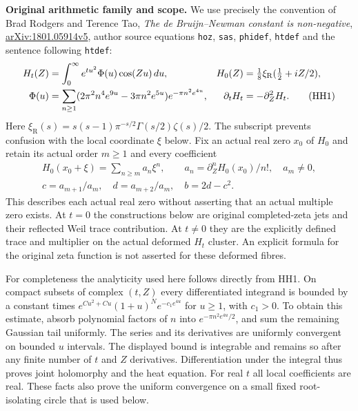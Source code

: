 \documentclass[11pt,a4paper]{article}
\theoremstyle{definition}\newtheorem{definition}[theorem]{Definition}
\begin{document}
\HH\textbf{Original arithmetic family and scope.}
We use precisely the convention of Brad Rodgers and Terence Tao,
\emph{The de Bruijn--Newman constant is non-negative},
\href{https://arxiv.org/abs/1801.05914v5}{arXiv:1801.05914v5},
author source equations \texttt{hoz}, \texttt{sas}, \texttt{phidef},
\texttt{htdef} and the sentence following \texttt{htdef}:
\begin{align}
 H_t(Z)&=\int_0^\infty e^{tu^2}\Phi(u)\cos(Zu)\,du,&
 H_0(Z)&=\tfrac18\xi_{\mathrm R}(\tfrac12+iZ/2),\notag\\
 \Phi(u)&=\sum_{n\ge1}
 (2\pi^2n^4e^{9u}-3\pi n^2e^{5u})e^{-\pi n^2e^{4u}},&
 \partial_tH_t&=-\partial_Z^2H_t .
 \tag{HH1}\label{hh:original}
\end{align}
Here $\xi_{\mathrm R}(s)=s(s-1)\pi^{-s/2}\Gamma(s/2)\zeta(s)/2$.
The subscript prevents confusion with the local coordinate $\xi$ below.
Fix an actual real zero $x_0$ of $H_0$ and retain its actual order
$m\ge1$ and every coefficient
\[
 \begin{gathered}
 H_0(x_0+\xi)=\sum_{n\ge m}a_n\xi^n,\qquad
 a_n=\partial_Z^nH_0(x_0)/n!,\quad a_m\ne0,\\
 c=a_{m+1}/a_m,\quad d=a_{m+2}/a_m,\quad b=2d-c^2 .
 \end{gathered}
 \tag{HH2}\label{hh:coeff}
\]
This describes each actual real zero without asserting that an actual
multiple zero exists. At $t=0$ the constructions below are original
completed-zeta jets and their reflected Weil trace contribution.
At $t\ne0$ they are the explicitly defined trace and multiplier on
the actual deformed $H_t$ cluster. An explicit formula for the original
zeta function is not asserted for these deformed fibres.

For completeness the analyticity used here follows directly from HH1.
On compact subsets of complex $(t,Z)$ every differentiated integrand
is bounded by a constant times
$e^{C u^2+Cu}(1+u)^N e^{-c_1e^{4u}}$ for $u\ge1$, with $c_1>0$.
To obtain this estimate, absorb polynomial factors of $n$ into
$e^{-\pi n^2e^{4u}/2}$, and sum the remaining Gaussian tail uniformly.
The series and its derivatives are uniformly convergent on bounded
$u$ intervals. The displayed bound is integrable and remains so
after any finite number of $t$ and $Z$ derivatives. Differentiation
under the integral thus proves joint holomorphy and the heat equation.
For real $t$ all local coefficients are real. These facts also prove
the uniform convergence on a small fixed root-isolating circle that
is used below.
\end{document}
